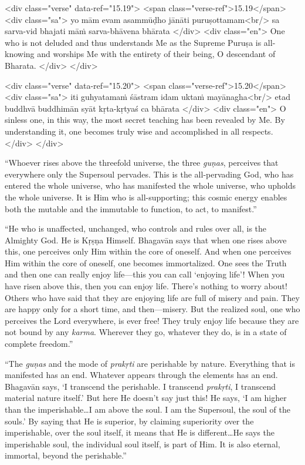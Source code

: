 \begin{html}
<div class="verse" data-ref="15.19">
  <span class="verse-ref">15.19</span>
  <div class="sa">
    yo mām evam asammūḍho jānāti puruṣottamam<br/>
    sa sarva-vid bhajati māṁ sarva-bhāvena bhārata
  </div>
  <div class="en">
    One who is not deluded and thus understands Me as the Supreme Puruṣa is all-knowing and worships Me with the entirety of their being, O descendant of Bharata.
  </div>
</div>
\end{html}



\begin{html}
<div class="verse" data-ref="15.20">
  <span class="verse-ref">15.20</span>
  <div class="sa">
    iti guhyatamaṁ śāstram idam uktaṁ mayānagha<br/>
    etad buddhvā buddhimān syāt kṛta-kṛtyaś ca bhārata
  </div>
  <div class="en">
    O sinless one, in this way, the most secret teaching has been revealed by Me. By understanding it, one becomes truly wise and accomplished in all respects.
  </div>
</div>
\end{html}


\enquote{Whoever rises above the threefold universe, the three \textit{guṇas}, perceives that everywhere only the Supersoul pervades. This is the all-pervading God, who has entered the whole universe, who has manifested the whole universe, who upholds the whole universe. It is Him who is all-supporting; this cosmic energy enables both the mutable and the immutable to function, to act, to manifest.}

\enquote{He who is unaffected, unchanged, who controls and rules over all, is the Almighty God. He is Kṛṣṇa Himself. Bhagavān says that when one rises above this, one perceives only Him within the core of oneself. And when one perceives Him within the core of oneself, one becomes immortalized. One sees the Truth and then one can really enjoy life---this you can call \enquote{enjoying life}! When you have risen above this, then you can enjoy life. There’s nothing to worry about! Others who have said that they are enjoying life are full of misery and pain. They are happy only for a short time, and then---misery. But the realized soul, one who perceives the Lord everywhere, is ever free! They truly enjoy life because they are not bound by any \textit{karma}. Wherever they go, whatever they do, is in a state of complete freedom.}

\enquote{The \textit{guṇas} and the mode of \textit{prakṛti} are perishable by nature. Everything that is manifested has an end. Whatever appears through the elements has an end. Bhagavān says, \enquote{I transcend the perishable. I transcend \textit{prakṛti}, I transcend material nature itself.} But here He doesn’t say just this! He says, \enquote{I am higher than the imperishable\ldots I am above the soul. I am the Supersoul, the soul of the souls.} By saying that He is superior, by claiming superiority over the imperishable, over the soul itself, it means that He is different\ldots He says the imperishable soul, the individual soul itself, is part of Him. It is also eternal, immortal, beyond the perishable.}

